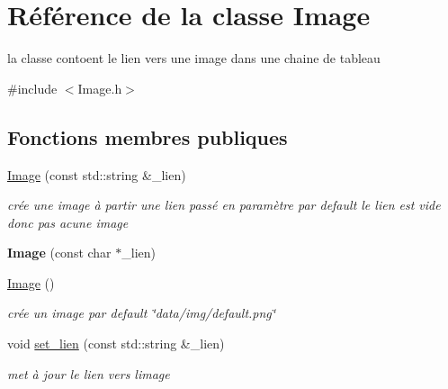\hypertarget{class_image}{}\section{Référence de la classe Image}
\label{class_image}


la classe contoent le lien vers une image dans une chaine de tableau  




{\ttfamily \#include $<$Image.\+h$>$}

\subsection*{Fonctions membres publiques}
\begin{DoxyCompactItemize}
\item 
\mbox{\label{class_image_a804cf781f8e8c78089e66441a3c1f650}} 
\mbox{\hyperlink{class_image_a804cf781f8e8c78089e66441a3c1f650}{Image}} (const std\+::string \&\+\_\+lien)
\begin{DoxyCompactList}\small\item\em crée une image à partir une lien passé en paramètre par default le lien est vide donc pas acune image \end{DoxyCompactList}\item 
\mbox{\label{class_image_ad3b1871165722f1324a45f0b33914e4e}} 
{\bfseries Image} (const char $\ast$\+\_\+lien)
\item 
\mbox{\label{class_image_a58edd1c45b4faeb5f789b0d036d02313}} 
\mbox{\hyperlink{class_image_a58edd1c45b4faeb5f789b0d036d02313}{Image}} ()
\begin{DoxyCompactList}\small\item\em crée un image par default \char`\"{}data/img/default.\+png\char`\"{} \end{DoxyCompactList}\item 
\mbox{\label{class_image_a01e7f7086e157349f449e0f3f1843d86}} 
void \mbox{\hyperlink{class_image_a01e7f7086e157349f449e0f3f1843d86}{set\+\_\+lien}} (const std\+::string \&\+\_\+lien)
\begin{DoxyCompactList}\small\item\em met à jour le lien vers l\textquotesingle{}image \end{DoxyCompactList}\item 

\end{DoxyCompactItemize}
